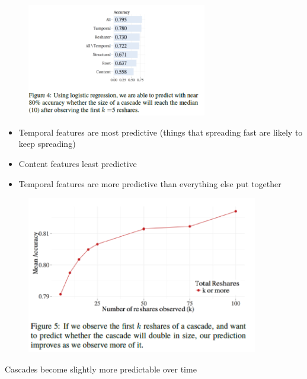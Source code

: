 \documentclass[aspectratio=169]{beamer}
\begin{document}
\begin{frame}

\begin{figure}
  \centering
  \includegraphics[width=0.7\textwidth]{figures/cheng_cascades_2014_fig4}
\end{figure}

\begin{itemize}
\item Temporal features are most predictive (things that spreading fast are likely to keep spreading) \pause
\item Content features least predictive \pause
\item Temporal features are more predictive than everything else put together
\end{itemize}


\end{frame}
\begin{frame}

\begin{figure}
  \centering
  \includegraphics[width=0.9\textwidth]{figures/cheng_cascades_2014_fig5}
\end{figure}

Cascades become slightly more predictable over time


\end{frame}
\end{document}
